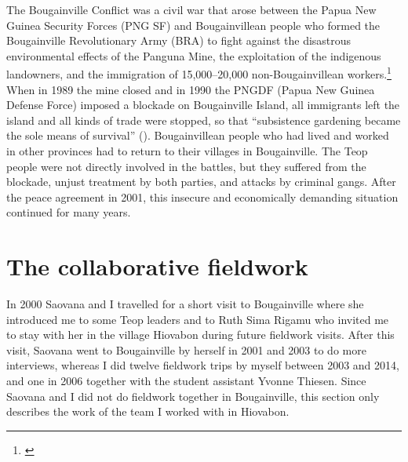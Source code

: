 \documentclass[output=paper]{langscibook}
\begin{document}
The Bougainville Conflict was a civil war that arose between the Papua New Guinea Security Forces (PNG SF) and Bougainvillean people who formed the Bougainville Revolutionary Army (BRA) to fight against the disastrous environmental effects of the Panguna Mine, the exploitation of the indigenous landowners, and the immigration of 15,000--20,000 non-Bougainvillean workers.\footnote{\textcite{Regan:2001ky}} When in 1989 the mine closed and in 1990 the PNGDF (Papua New Guinea Defense Force) imposed a blockade on Bougainville Island, all immigrants left the island and all kinds of trade were stopped, so that ``subsistence gardening became the sole means of survival'' (\cite[4]{Havini:2004tt}). Bougainvillean people who had lived and worked in other provinces had to return to their villages in Bougainville. The Teop people were not directly involved in the battles, but they suffered from the blockade, unjust treatment by both parties, and attacks by criminal gangs. After the peace agreement in 2001, this insecure and economically demanding situation continued for many years. 

\section{The collaborative fieldwork}
\largerpage[-1]
In 2000 Saovana and I travelled for a short visit to Bougainville where she introduced me to some Teop leaders and to Ruth Sima Rigamu who invited me to stay with her in the village Hiovabon during future fieldwork visits. After this visit, Saovana went to Bougainville by herself in 2001 and 2003 to do more interviews, whereas I did twelve fieldwork trips by myself between 2003 and 2014, and one in 2006 together with the student assistant Yvonne Thiesen. Since Saovana and I did not do fieldwork together in Bougainville, this section only describes the work of the team I worked with in Hiovabon.
\end{document}

